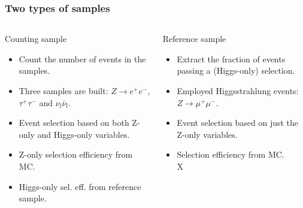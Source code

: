 \begin{frame}
  \frametitle{Two types of samples}
  \begin{columns}[c,onlytextwidth]
  \begin{column}{0.5\textwidth}
  \begin{block}{Counting sample}
  \begin{itemize}
    \item Count the number of events in the samples.
    \item Three samples are built:
        $Z\rightarrow e^+ e^-$, $\tau^+ \tau^-$ and $\nu_l \bar{\nu}_l$.
    \item Event selection based on both Z-only and Higgs-only variables.
    \item Z-only selection efficiency from MC.
    \item Higgs-only sel. eff. from reference sample.
  \end{itemize}
  \end{block}
  \end{column}
  \begin{column}{0.5\textwidth}
  \begin{block}{Reference sample}
  \begin{itemize}
    \item Extract the fraction of events passing a (Higgs-only) selection.
    \item Employed Higgsstrahlung events: $Z\rightarrow \mu^+ \mu^-$.
    \item Event selection based on just the Z-only variables.
    \item Selection efficiency from MC. \\ {\color{white} X}
  \end{itemize}
  \end{block}
  \end{column}
  \end{columns}
  \end{frame}

